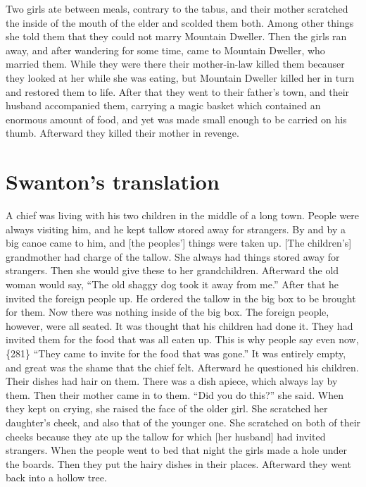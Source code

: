 Two girls ate between meals, contrary to the tabus, and their mother scratched the inside of the mouth of the elder and scolded them both.
Among other things she told them that they could not marry Mountain Dweller.
Then the girls ran away, and after wandering for some time, came to Mountain Dweller, who married them.
While they were there their mother-in-law killed them becauser they looked at her while she was eating, but Mountain Dweller killed her in turn and restored them to life.
After that they went to their father’s town, and their husband accompanied them, carrying a magic basket which contained an enormous amount of food, and yet was made small enough to be carried on his thumb.
Afterward they killed their mother in revenge.

\section{Swanton’s translation}\label{sec:92-swanton-translation}

A chief was living with his two children in the middle of a long town.
People were always visiting him, and he kept tallow stored away for strangers.
By and by a big canoe came to him, and [the peoples’] things were taken up.
{}[The children’s] grandmother had charge of the tallow.
She always had things stored away for strangers.
Then she would give these to her grandchildren.
Afterward the old woman would say,
“The old shaggy dog took it away from me.”
After that he invited the foreign people up.
He ordered the tallow in the big box to be brought for them.
Now there was nothing inside of the big box.
The foreign people, however, were all seated.
It was thought that his children had done it.
They had invited them for the food that was all eaten up.
This is why people say even now,
\{281\} “They came to invite for the food that was gone.”
It was entirely empty, and great was the shame that the chief felt.
Afterward he questioned his children.
Their dishes had hair on them.
There was a dish apiece, which always lay by them.
Then their mother came in to them.
“Did you do this?”
she said.
When they kept on crying, she raised the face of the older girl.
She scratched her daughter’s cheek, and also that of the younger one.
She scratched on both of their cheeks because they ate up the tallow for which [her husband] had invited strangers.
When the people went to bed that night the girls made a hole under the boards.
Then they put the hairy dishes in their places.
Afterward they went back into a hollow tree.

